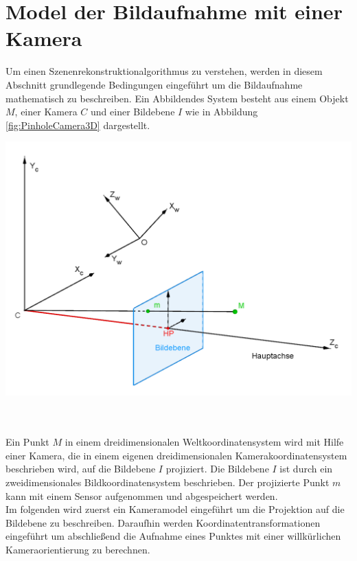 \chapter{Model der Bildaufnahme mit einer Kamera }
\label{sec:CameraModels}

Um einen Szenenrekonstruktionalgorithmus zu verstehen, werden in diesem Abschnitt grundlegende  Bedingungen eingeführt um die Bildaufnahme mathematisch zu beschreiben. Ein Abbildendes System besteht aus einem Objekt $M$, einer Kamera $C$ und einer Bildebene $I$ wie in Abbildung \ref{fig:PinholeCamera3D} dargestellt.\\

\begin{minipage}{\linewidth}
	\centering
	\includegraphics[width=.8\linewidth]{images/PinholeCameraModell3D.png}
	\label{fig:PinholeCamera3D}
\end{minipage}\\\\

Ein Punkt $M$ in einem dreidimensionalen Weltkoordinatensystem wird mit Hilfe einer Kamera, die in einem eigenen dreidimensionalen Kamerakoordinatensystem beschrieben wird, auf die Bildebene $I$ projiziert. Die Bildebene $I$ ist durch ein zweidimensionales Bildkoordinatensystem beschrieben. Der projizierte Punkt $m$ kann mit einem Sensor aufgenommen und abgespeichert werden.  \\ 

Im folgenden wird zuerst ein Kameramodel eingeführt um die Projektion auf die Bildebene zu beschreiben. Daraufhin werden Koordinatentransformationen eingeführt um abschließend die Aufnahme eines Punktes mit einer willkürlichen Kameraorientierung zu berechnen. 



